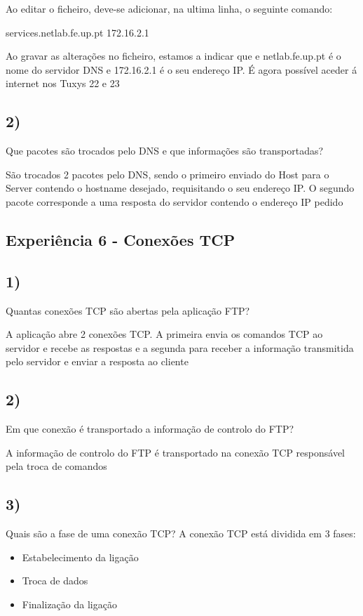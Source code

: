 \documentclass[11pt]{article}
\begin{document}
Ao editar o ficheiro, deve-se adicionar, na ultima linha, o seguinte comando:

services.netlab.fe.up.pt 172.16.2.1

Ao gravar as alterações no ficheiro, estamos a indicar que e netlab.fe.up.pt é o nome do servidor DNS e 172.16.2.1 é o seu endereço IP. É agora possível aceder á internet nos Tuxys 22 e 23


\subsection{2)} Que pacotes são trocados pelo DNS e que informações são transportadas? 

São trocados 2 pacotes pelo DNS, sendo o primeiro enviado do Host para o Server contendo o hostname desejado, requisitando o seu endereço IP. O segundo pacote corresponde a uma resposta do servidor contendo o endereço IP pedido

\subsection{Experiência 6 - Conexões TCP}

\subsection{1)} Quantas conexões TCP são abertas pela aplicação FTP?

A aplicação abre 2 conexões TCP. A primeira envia os comandos TCP ao servidor e recebe as respostas e a segunda para receber a informação transmitida pelo servidor e enviar a resposta ao cliente

\subsection{2)} Em que conexão é transportado a informação de controlo do FTP?

A informação de controlo do FTP é transportado na conexão TCP responsável pela troca de comandos

\subsection{3)} Quais são a fase de uma conexão TCP?
A conexão TCP está dividida em 3 fases:

\begin{itemize}
\item Estabelecimento da ligação
\item Troca de dados
\item Finalização da ligação
\end{itemize}
\end{document}
